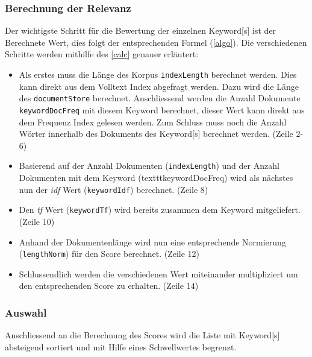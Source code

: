 

\subsubsection{Berechnung der Relevanz}
Der wichtigste Schritt für die Bewertung der einzelnen \gls{Keyword}[s] ist der Berechnete Wert, dies folgt der entsprechenden Formel (\autoref{algo}). Die verschiedenen Schritte werden mithilfe des \autoref{calc} genauer erläutert:
\begin{itemize}
    \item Als erstes muss die Länge des Korpus \texttt{indexLength} berechnet werden. Dies kann direkt aus dem Volltext Index abgefragt werden. Dazu wird die Länge des \texttt{documentStore} berechnet. Anschliessend werden die Anzahl Dokumente \texttt{keywordDocFreq} mit diesem \gls{Keyword} berechnet, dieser Wert kann direkt aus dem Frequenz Index gelesen werden. Zum Schluss muss noch die Anzahl Wörter innerhalb des Dokuments des \gls{Keyword}[s] berechnet werden. (Zeile 2-6)
    \item Basierend auf der Anzahl Dokumenten (\texttt{indexLength}) und der Anzahl Dokumenten mit dem \gls{Keyword} (texttt{keywordDocFreq}) wird als nächstes nun der \textit{idf} Wert (\texttt{keywordIdf}) berechnet. (Zeile 8)
    \item Den \textit{tf} Wert (\texttt{keywordTf}) wird bereits zusammen dem \gls{Keyword} mitgeliefert. (Zeile 10)
    \item Anhand der Dokumentenlänge wird nun eine entsprechende Normierung (\texttt{lengthNorm}) für den Score berechnet. (Zeile 12)
    \item Schlussendlich werden die verschiedenen Wert miteinander multipliziert um den entsprechenden Score zu erhalten. (Zeile 14)
\end{itemize}


\subsubsection{Auswahl}
Anschliessend an die Berechnung des Scores wird die Liste mit \gls{Keyword}[s] absteigend sortiert und mit Hilfe eines Schwellwertes begrenzt.

